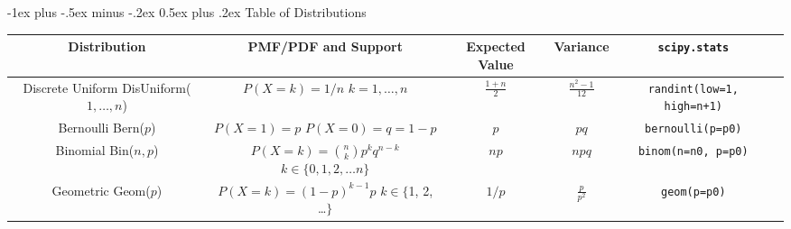 \documentclass[10pt,landscape]{article}
\makeatletter
\newcommand{\DisUniform}{\textrm{DisUniform}}
\newcommand{\Bern}{\textrm{Bern}}
\newcommand{\Bin}{\textrm{Bin}}
\newcommand{\Geom}{\textrm{Geom}}
\newcommand{\NBin}{\textrm{NBin}}
\newcommand{\Hypergeometric}{\textrm{HGeom}}
\renewcommand{\section}{\@startsection{section}{1}{0mm}%
                                {-1ex plus -.5ex minus -.2ex}%
                                {0.5ex plus .2ex}%
                                {\normalfont\large\bfseries}}
\makeatother
\begin{document}
\section{Table of Distributions}
\begin{center}
\renewcommand{\arraystretch}{3.7}
\begin{tabular}{cccccc}
\textbf{Distribution} & \textbf{PMF/PDF and Support} &
\textbf{Expected Value}  & \textbf{Variance} & \texttt{scipy.stats}\\
\hline
\shortstack{Discrete Uniform \\ \DisUniform($1,\dots,n$)} & \shortstack{$P(X=k) = 1/n$ \\$ k=1,\dots, n$} &
$\frac{1+n}{2}$ & $\frac{n^2 - 1}{12}$ & \texttt{randint(low=1, high=n+1)}\\
\hline
\shortstack{Bernoulli \\ \Bern($p$)} & \shortstack{$P(X=1) = p$ \\$ P(X=0) = q=1-p$} &
$p$ & $pq$ & \texttt{bernoulli(p=p0)}\\
\hline
\shortstack{Binomial \\ \Bin($n, p$)} & \shortstack{$P(X=k) = {n \choose k}p^k q^{n-k}$  \\ $k \in \{0, 1, 2, \dots n\}$}&
$np$ & $npq$ & \texttt{binom(n=n0, p=p0)}\\
\hline
\shortstack{Geometric \\ \Geom($p$)} & \shortstack{$P(X=k) = (1-p)^{k-1}p$  \\ $k \in \{$1, 2, \dots $\}$}& $1/p$ & $\frac{p}{p^2}$ & \texttt{geom(p=p0)}\\
\hline

\end{tabular}
\end{center}
\end{document}
